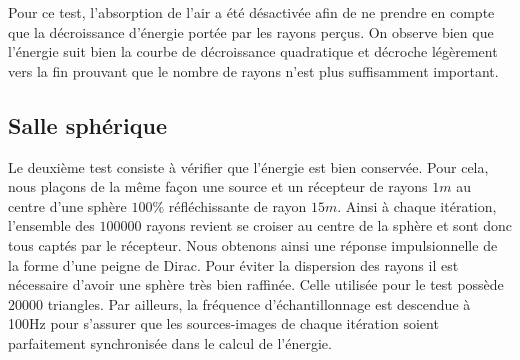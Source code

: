 Pour ce test, l'absorption de l'air a été désactivée afin de ne prendre en compte que la décroissance d'énergie portée par les rayons perçus. On observe bien que l'énergie suit bien la courbe de décroissance quadratique et décroche légèrement vers la fin prouvant que le nombre de rayons n'est plus suffisamment important.
 		
\subsection{Salle sphérique}

Le deuxième test consiste à vérifier que l'énergie est bien conservée. Pour cela, nous plaçons de la même façon une source et un récepteur de rayons $1m$ au centre d'une sphère $100\%$ réfléchissante de rayon $15m$. Ainsi à chaque itération, l'ensemble des $100000$ rayons revient se croiser au centre de la sphère et sont donc tous captés par le récepteur. Nous obtenons ainsi une réponse impulsionnelle de la forme d'une peigne de Dirac. Pour éviter la dispersion des rayons il est nécessaire d'avoir une sphère très bien raffinée. Celle utilisée pour le test possède $20000$ triangles. Par ailleurs, la fréquence d'échantillonnage est descendue à 100Hz pour s'assurer que les sources-images de chaque itération soient parfaitement synchronisée dans le calcul de l'énergie.

